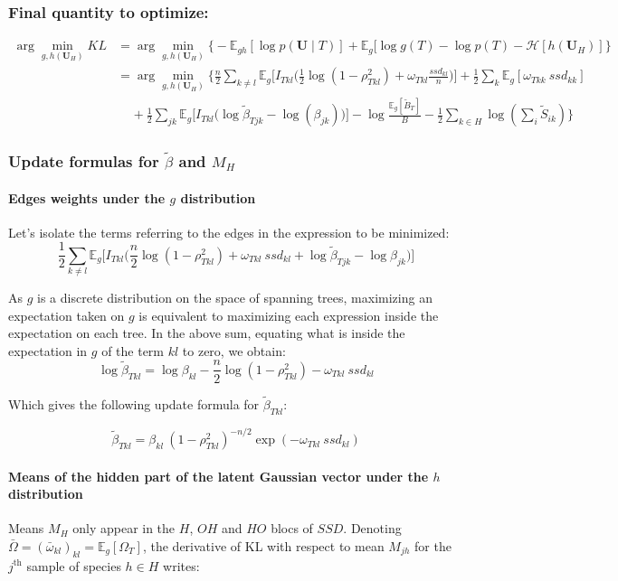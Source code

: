 \documentclass[11pt,a4paper]{article}
\newcommand{\argmin}{\arg\!\min}
\newcommand{\entr}{\mathcal{H}}
\newcommand{\Ubf}{\boldsymbol{U}}
\newcommand{\Esp}{\mathds{E}}
\begin{document}
\subsubsection{Final quantity to optimize:}
\begin{align*}
\argmin_{g,h(\Ubf_H)} KL  &=\argmin_{g,h(\Ubf_H)}  \Big\{-\Esp_{gh}[\log p(\Ubf \mid T) ] + \Esp_g[\log g(T) - \log p(T)-\entr[h(\Ubf_H)]\Big\}\\
&= \argmin_{g,h(\Ubf_H)}  \bigg\{   \frac{n}{2}\sum _{k \neq l} \Esp_g\Big[ I_{Tkl}\Big(\frac{1}{2}\log(1-\rho_{Tkl}^2)+ \omega_{Tkl} \frac{ssd_{kl}}{n}\Big)\Big] +\frac{1}{2}  \sum_k \Esp_g[\omega_{Tkk}\: ssd_{kk}] \\
& \;\;\;\; +\frac{1}{2}\sum_{jk} \Esp_g\Big[I_{Tkl} \big(\log \widetilde{\beta}_{Tjk}-\log(\beta_{jk})\big)\Big] - \log \frac{\Esp_g[\widetilde{B}_T]}{B} -\frac{1}{2}\sum_{k\in H} \log\left(\sum_i \widetilde{S}_{ik}\right) \bigg\}
\end{align*}
 
 
 \subsubsection{Update formulas for $\widetilde{\beta}$ and $M_H$ }

\paragraph{Edges weights under the $g$ distribution \\}
Let's isolate the terms referring to the edges in the expression to be minimized:
$$ \frac{1}{2}\sum _{k \neq l} \Esp_g\Big[I_{Tkl}\Big(\frac{n}{2} \log(1-\rho_{Tkl}^2)+ \omega_{Tkl}\:ssd_{kl}+\log \widetilde{\beta}_{Tjk}-\log\beta_{jk}\Big)\Big]  $$
 
 
As $g$ is a discrete distribution on the space of spanning trees, maximizing an expectation taken on $g$ is equivalent to maximizing each expression inside the expectation on each tree. In the above sum, equating what is inside the expectation in $g$ of the term $kl$ to zero, we obtain:
 $$\log \widetilde{\beta}_{Tkl} = \log \beta_{kl} - \frac{n}{2} \log  (1-\rho_{Tkl}^2) - \omega_{Tkl}\:ssd_{kl}$$
 
Which gives the following update formula for $\widetilde{\beta}_{Tkl}$:
 
  $$\boxed{\displaystyle \widetilde{\beta}_{Tkl} = \beta_{kl} \: (1-\rho_{Tkl}^2)^{-n/2} \exp( -\omega_{Tkl}\: ssd_{kl} ) }$$


\paragraph{Means of the hidden part of the latent Gaussian vector under the $h$ distribution \\}
Means $M_H$ only appear in the $H$, $OH$ and $HO$ blocs of $SSD$. Denoting $\bar{\Omega} = (\bar{\omega}_{kl})_{kl} =\Esp_g[\Omega_T]$, the derivative of KL with respect to mean $M_{jh}$ for the $j^\text{th}$ sample of species $h\in H$ writes:
\end{document}
